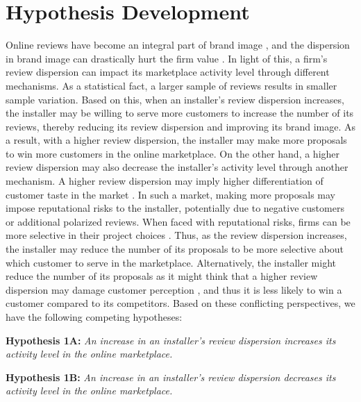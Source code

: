 \documentclass[msom,blindrev]{informs3}
\begin{document}
	
	
\section{Hypothesis Development} \label{Sec: Hypothesis}
	
	
	
	Online reviews have become an integral part of brand image \citep{chakraborty2018credibility,chakraborty2018effects}, and the dispersion in brand image can drastically hurt the firm value \citep{luo2013impact}. In light of this, a firm's review dispersion can impact its marketplace activity level through different mechanisms. As a statistical fact, a larger sample of reviews results in smaller sample variation. Based on this, when an installer's review dispersion increases, the installer may be willing to serve more customers to increase the number of its reviews, thereby reducing its review dispersion and improving its brand image. As a result, with a higher review dispersion, the installer may make more proposals to win more customers in the online marketplace. On the other hand, a higher review dispersion may also decrease the installer's activity level through another mechanism. A higher review dispersion may imply higher differentiation of customer taste in the market \citep{clemons2006online}. In such a market, making more proposals may impose reputational risks to the installer, potentially due to negative customers or additional polarized reviews. When faced with reputational risks, firms can be more selective in their project choices \citep{demirag2011risks,hirshleifer1992managerial}. Thus, as the review dispersion increases, the installer may reduce the number of its proposals to be more selective about which customer to serve in the marketplace. Alternatively, the installer might reduce the number of its proposals as it might think that a higher review dispersion may damage customer perception \citep{Zhu}, and thus it is less likely to win a customer compared to its competitors. Based on these conflicting perspectives, we have the following competing hypotheses:
	
	
	\noindent\textbf{Hypothesis 1A:} \emph{An increase in an installer's review dispersion increases its activity level in the online marketplace.}
	
	\noindent\textbf{Hypothesis 1B:} \emph{An increase in an installer's review dispersion decreases its activity level in the online marketplace.}
	
\end{document}
